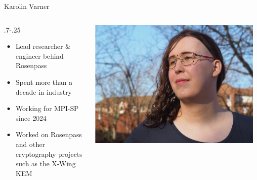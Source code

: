 \begin{frame}{Karolin Varner}
  \begin{columns}[fullwidth,c]
	\hspace*{.25\LeftSlideIndent}%
    \begin{column}{\dimexpr.7\linewidth-.25\LeftSlideIndent}
      \begin{itemize}
        \item Lead researcher \& engineer behind Rosenpass
        \item Spent more than a decade in industry
        \item Working for MPI-SP since 2024
        \item Worked on Rosenpass and other cryptography projects such as the X-Wing KEM
      \end{itemize}
    \end{column}%
    \begin{column}{.3\linewidth}
      \includegraphics[width=.92\linewidth,trim=200 0 100 0,clip]{graphics/karolin-varner.jpg}
    \end{column}
  \end{columns}
\end{frame}

